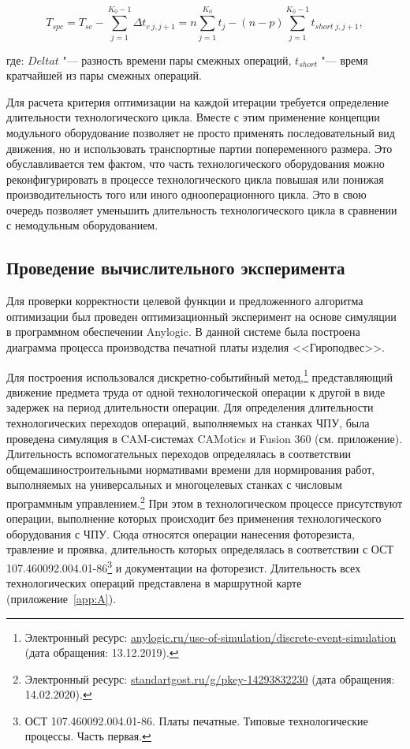 \begin{equation}
T_{spc} = T_{sc} - \sum_{j=1}^{K_{0}-1}\Delta t_{c \;  j,j+1} = n \sum_{j=1}^{K_0}t_j-(n-p)\sum_{j=1}^{K_{0}-1}t_{short \; j,j+1},
\label{eq:spc}
\end{equation}

\noindent где: $Delta t$ "--- разность времени пары смежных операций, $t_{short}$ "--- время кратчайшей из пары смежных операций. 

Для расчета критерия оптимизации на каждой итерации требуется определение длительности технологического цикла. Вместе с этим применение концепции модульного оборудование позволяет не просто применять последовательный вид движения, но и использовать транспортные партии попеременного размера. Это обуславливается тем фактом, что часть технологического оборудования можно реконфигурировать в процессе технологического цикла повышая или понижая производительность того или иного однооперационного цикла.  Это в свою очередь позволяет уменьшить длительность технологического цикла в сравнении с немодульным оборудованием.

\subsection{Проведение вычислительного эксперимента}

Для проверки корректности целевой функции и предложенного алгоритма оптимизации был проведен оптимизационный эксперимент на основе симуляции в программном обеспечении Anylogic. В данной системе была построена диаграмма процесса производства печатной платы изделия <<Гироподвес>>.

Для построения использовался дискретно-событийный метод,\footnote{Электронный ресурс: {\tiny\url{anylogic.ru/use-of-simulation/discrete-event-simulation}} (дата обращения: 13.12.2019).} представляющий движение предмета труда от одной технологической операции к другой в виде задержек на период длительности операции. Для определения длительности технологических переходов операций, выполняемых на станках ЧПУ, была проведена симуляция в CAM-системах CAMotics и Fusion 360 (см. приложение). Длительность вспомогательных переходов определялась в соответствии общемашиностроительными нормативами времени для нормирования работ, выполняемых на универсальных и многоцелевых станках с числовым программным управлением.\footnote{Электронный ресурс: \url{standartgost.ru/g/pkey-14293832230} (дата обращения: 14.02.2020).} При этом в технологическом процессе присутствуют операции, выполнение которых происходит без применения технологического оборудования с ЧПУ. Сюда относятся операции нанесения фоторезиста, травление и проявка, длительность которых определялась в соответствии с ОСТ 107.460092.004.01-86\footnote{ОСТ 107.460092.004.01-86. Платы печатные. Типовые технологические процессы. Часть первая.} и документации на фоторезист. Длительность всех технологических операций представлена в маршрутной карте (приложение~\cref{app:A}).

